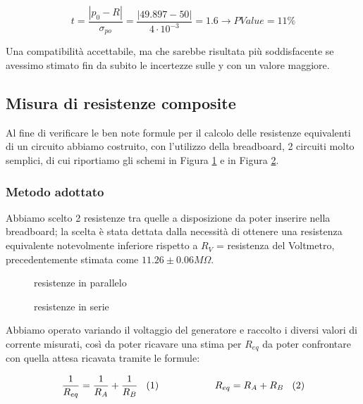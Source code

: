 \documentclass[a4paper]{article}
\theoremstyle{definition}
\begin{document}
\[ t = \frac{\left|p_{0} - R\right|}{\sigma_{po}} = \frac{\left |49.897 - 50\right|}{4 \cdot 10^{-3}} = 1.6 \rightarrow PValue = 11\%\]

\noindent Una compatibilità accettabile, ma che sarebbe risultata più soddisfacente se avessimo stimato fin da subito le incertezze sulle y con un valore maggiore. 

\subsection{Misura di resistenze composite}
Al fine di verificare le ben note formule per il calcolo delle resistenze equivalenti di un circuito abbiamo costruito, con l'utilizzo della breadboard, 2 circuiti molto semplici, di cui riportiamo gli schemi in Figura \ref{fig:resParall} e in Figura \ref{fig:resSerie}.

\subsubsection*{Metodo adottato}
Abbiamo scelto 2 resistenze tra quelle a disposizione da poter inserire nella breadboard; la scelta è stata dettata dalla necessità di ottenere una resistenza equivalente notevolmente inferiore rispetto a \(R_{V}\) = resistenza del Voltmetro, precedentemente stimata come \(11.26 \pm 0.06 M\Omega\).\\

\begin{figure}[!h]
\hfill
{}
\hfill
{}
\hfill
\caption{resistenze in parallelo}
\label{fig:resParall}
\end{figure}


\begin{figure}[!h]
\hfill
{}
\hfill
{}
\hfill
\caption{resistenze in serie}
\label{fig:resSerie}
\end{figure}

\noindent Abbiamo operato variando il voltaggio del generatore e raccolto i diversi valori di corrente misurati, così da poter ricavare una stima per \(R_{eq}\) da poter confrontare con quella attesa ricavata tramite le formule:


\[ \frac{1}{R_{eq}} = \frac{1}{R_{A}} + \frac{1}{R_{B}} \hspace{0.3cm} (1)  \hspace{2cm}  R_{eq} = R_{A} + R_{B} \hspace{0.3cm}  (2)\]
\end{document}
